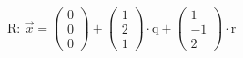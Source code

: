 \documentclass[preview]{standalone}
\begin{document}
\begin{center}
$\mathrm{R: \:} \vec{x} = \begin{pmatrix} 0 \\ 0 \\ 0 \end{pmatrix} + \begin{pmatrix} 1 \\ 2 \\ 1 \end{pmatrix} \cdot \mathrm{q} + \begin{pmatrix} 1 \\ -1 \\ 2 \end{pmatrix} \cdot \mathrm{r}$
\end{center}
\end{document}
